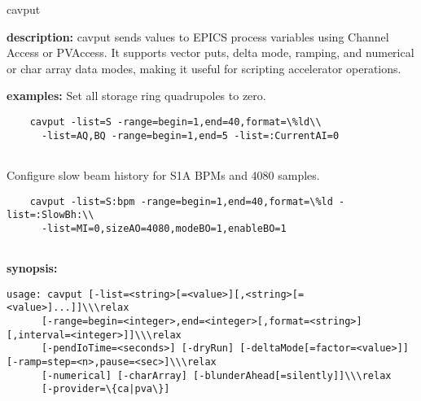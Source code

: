 \begin{sddsprog}{cavput}
\item \textbf{description:}
    cavput sends values to EPICS process variables using Channel Access or PVAccess. It supports vector puts, delta mode, ramping, and numerical or char array data modes, making it useful for scripting accelerator operations.
\item \textbf{examples:}
    Set all storage ring quadrupoles to zero.
    \begin{verbatim}
    cavput -list=S -range=begin=1,end=40,format=\%ld\\
      -list=AQ,BQ -range=begin=1,end=5 -list=:CurrentAI=0
    
\end{verbatim}
    Configure slow beam history for S1A BPMs and 4080 samples.
    \begin{verbatim}
    cavput -list=S:bpm -range=begin=1,end=40,format=\%ld -list=:SlowBh:\\
      -list=MI=0,sizeAO=4080,modeBO=1,enableBO=1
    
\end{verbatim}
\item \textbf{synopsis:}
    \begin{verbatim}
usage: cavput [-list=<string>[=<value>][,<string>[=<value>]...]]\\\relax
      [-range=begin=<integer>,end=<integer>[,format=<string>][,interval=<integer>]]\\\relax
      [-pendIoTime=<seconds>] [-dryRun] [-deltaMode[=factor=<value>]] [-ramp=step=<n>,pause=<sec>]\\\relax
      [-numerical] [-charArray] [-blunderAhead[=silently]]\\\relax
      [-provider=\{ca|pva\}]
    

\end{verbatim}
\end{sddsprog}
